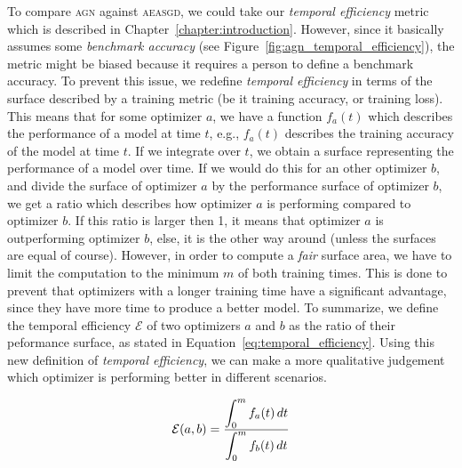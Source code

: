 To compare \textsc{agn} against \textsc{aeasgd}, we could take our \emph{temporal efficiency} metric which is described in Chapter~\ref{chapter:introduction}. However, since it basically assumes some \emph{benchmark accuracy} (see Figure~\ref{fig:agn_temporal_efficiency}), the metric might be biased because it requires a person to define a benchmark accuracy. To prevent this issue, we redefine \emph{temporal efficiency} in terms of the surface described by a training metric (be it training accuracy, or training loss). This means that for some optimizer $a$, we have a function $f_a(t)$ which describes the performance of a model at time $t$, e.g., $f_a(t)$ describes the training accuracy of the model at time $t$. If we integrate over $t$, we obtain a surface representing the performance of a model over time. If we would do this for an other optimizer $b$, and divide the surface of optimizer $a$ by the performance surface of optimizer $b$, we get a ratio which describes how optimizer $a$ is performing compared to optimizer $b$. If this ratio is larger then 1, it means that optimizer $a$ is outperforming optimizer $b$, else, it is the other way around (unless the surfaces are equal of course). However, in order to compute a \emph{fair} surface area, we have to limit the computation to the minimum $m$ of both training times. This is done to prevent that optimizers with a longer training time have a significant advantage, since they have more time to produce a better model. To summarize, we define the temporal efficiency $\mathcal{E}$ of two optimizers $a$ and $b$ as the ratio of their peformance surface, as stated in Equation~\ref{eq:temporal_efficiency}. Using this new definition of \emph{temporal efficiency}, we can make a more qualitative judgement which optimizer is performing better in different scenarios.

\begin{equation}
  \label{eq:temporal_efficiency}
  \mathcal{E}(a,b) = \frac{\displaystyle \int_0^m f_a(t) \,dt}{\displaystyle \int_0^m f_b(t) \,dt}
\end{equation}


